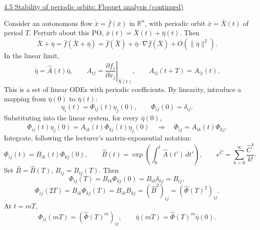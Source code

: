 \documentclass[11pt,a4paper]{article}
\begin{document}
\newpage
\noindent\underline{4.5 Stability of periodic orbits: Floquet analysis (continued)}

\medskip
\noindent Consider an autonomous flow $\dot{\bar x}=\bar f(\bar x)$ in
$\mathbb R^n$, with periodic orbit $\bar x=\bar X(t)$ of period $T$.
Perturb about this PO, $\bar x(t)=\bar X(t)+\bar\eta(t)$. Then
\[
\dot{\bar X}+\dot{\bar\eta}
=\bar f(\bar X+\bar\eta)
=\bar f(\bar X)+\bar\eta\cdot\nabla\bar f(\bar X)+O(\|\bar\eta\|^2).
\]
In the linear limit,
\[
\dot{\bar\eta}=\widehat A(t)\bar\eta,\qquad
A_{ij}=\left.\frac{\partial f_i}{\partial x_j}\right|_{\bar X(t)},
\qquad A_{ij}(t+T)=A_{ij}(t).
\]
This is a set of linear ODEs with periodic coefficients. By linearity,
introduce a mapping from $\bar\eta(0)$ to $\bar\eta(t)$:
\[
\eta_i(t)=\Phi_{ij}(t)\eta_j(0),\qquad \Phi_{ij}(0)=\delta_{ij}.
\]
Substituting into the linear system, for every $\bar\eta(0)$,
\[
\dot\Phi_{ij}(t)\eta_j(0)=A_{ik}(t)\Phi_{kj}(t)\eta_j(0)
\quad\Longrightarrow\quad \dot\Phi_{ij}=A_{ik}(t)\Phi_{kj}.
\]
Integrate, following the lecturer's matrix-exponential notation:
\[
\Phi_{ij}(t)=B_{ik}(t)\Phi_{kj}(0),\qquad
\widehat B(t)=\exp\!\left(\int_0^t\widehat A(t')\,dt'\right),
\qquad e^{\widehat C}=\sum_{k=0}^{\infty}\frac{\widehat C^k}{k!}.
\]
Set $\widehat B=\widehat B(T)$, $B_{ij}=B_{ij}(T)$. Then
\[
\Phi_{ij}(T)=B_{ik}\Phi_{kj}(0)=B_{ik}\delta_{kj}=B_{ij},
\]
\[
\Phi_{ij}(2T)=B_{ik}\Phi_{kj}(T)=B_{ik}B_{kj}
=(\widehat B^2)_{ij}=(\widehat\Phi(T)^2)_{ij}.
\]
At $t=mT$,
\[
\Phi_{ij}(mT)=(\widehat\Phi(T)^m)_{ij},\qquad
\boxed{\bar\eta(mT)=\widehat\Phi(T)^m\bar\eta(0)}.
\]
\end{document}
